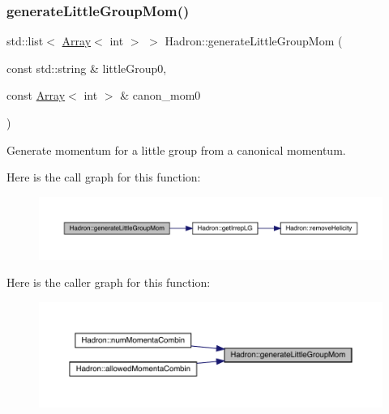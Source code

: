 \subsubsection{\texorpdfstring{generateLittleGroupMom()}{generateLittleGroupMom()}}
{\footnotesize\ttfamily std\+::list$<$ \mbox{\hyperlink{classXMLArray_1_1Array}{Array}}$<$ int $>$ $>$ Hadron\+::generate\+Little\+Group\+Mom (\begin{DoxyParamCaption}\item[{const std\+::string \&}]{little\+Group0,  }\item[{const \mbox{\hyperlink{classXMLArray_1_1Array}{Array}}$<$ int $>$ \&}]{canon\+\_\+mom0 }\end{DoxyParamCaption})}



Generate momentum for a little group from a canonical momentum. 

Here is the call graph for this function\+:\nopagebreak
\begin{figure}[H]
\begin{center}
\leavevmode
\includegraphics[width=350pt]{d1/daf/namespaceHadron_a12d4f9d40cac2700ebb7a7420f20987b_cgraph}
\end{center}
\end{figure}
Here is the caller graph for this function\+:\nopagebreak
\begin{figure}[H]
\begin{center}
\leavevmode
\includegraphics[width=350pt]{d1/daf/namespaceHadron_a12d4f9d40cac2700ebb7a7420f20987b_icgraph}
\end{center}
\end{figure}
\mbox{\label{namespaceHadron_a82bbcfd69a36dd0f63d6181069ff7393}} 
